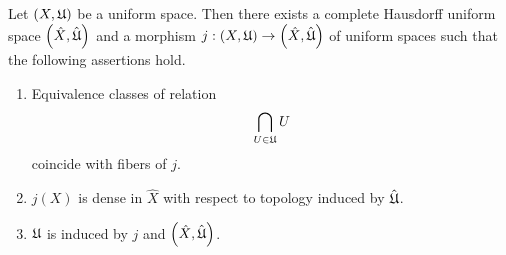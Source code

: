 \begin{theorem}\label{theorem:existence_of_completion}
Let $\left(X,{\mathfrak U}\right)$ be a uniform space. Then there exists a complete Hausdorff uniform space $\left(\hat{X},\hat{{\mathfrak U}}\right)$ and a morphism $j:\left(X,{\mathfrak U}\right)\rightarrow \left(\hat{X},\hat{{\mathfrak U}}\right)$ of uniform spaces such that the following assertions hold.
\begin{enumerate}[label=\emph{\textbf{(\arabic*)}}, leftmargin=*]
\item Equivalence classes of relation
$$\bigcap_{U\in {\mathfrak U}}U$$
coincide with fibers of $j$.
\item $j(X)$ is dense in $\hat{X}$ with respect to topology induced by $\hat{{\mathfrak U}}$.
\item ${\mathfrak U}$ is induced by $j$ and $\left(\hat{X},\hat{{\mathfrak U}}\right)$.
\end{enumerate}
\end{theorem}
